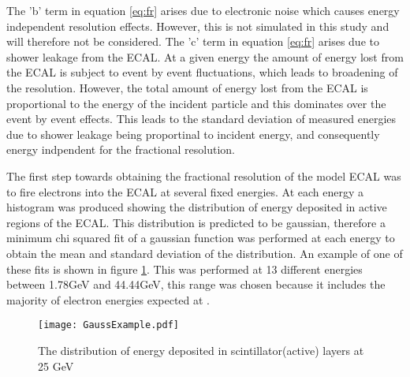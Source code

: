 The 'b' term in equation \ref{eq:fr} arises due to electronic noise which causes energy independent resolution effects.  However, this is not simulated in this study and will therefore not be considered.  The 'c' term in equation \ref{eq:fr} arises due to shower leakage from the ECAL.  At a given energy the amount of energy lost from the ECAL is subject to event by event fluctuations, which leads to broadening of the resolution.  However, the total amount of energy lost from the ECAL is proportional to the energy of the incident particle and this dominates over the event by event effects.  This leads to the standard deviation of measured energies due to shower leakage being proportinal to incident energy, and consequently energy indpendent for the fractional resolution.

The first step towards obtaining the fractional resolution of the model ECAL was to fire electrons into the ECAL at several fixed energies.  At each energy a histogram was produced showing the distribution of energy deposited in active regions of the ECAL.  This distribution is predicted to be gaussian, therefore a minimum chi squared fit of a gaussian function was performed at each energy to obtain the mean and standard deviation of the distribution. An example of one of these fits is shown in figure \ref{fig:Gauss}.  This was performed at 13 different energies between 1.78GeV and 44.44GeV, this range was chosen because it includes the majority of electron energies expected at \lhcb.

\begin{figure}[h]
  \centering
  \texttt{[image: GaussExample.pdf]}
  \caption{The distribution of energy deposited in scintillator(active) layers at 25 GeV}
  \label{fig:Gauss}
\end{figure}

